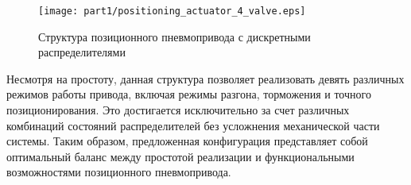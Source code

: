 \begin{figure}[ht]
    \centerfloat
    \texttt{[image: part1/positioning\_actuator\_4\_valve.eps]}
    \caption{Структура позиционного пневмопривода с дискретными распределителями}\label{fig:pp_base_struct}
    \end{figure}


Несмотря на простоту, данная структура позволяет реализовать девять различных режимов
работы привода, включая режимы разгона, торможения и точного позиционирования. Это достигается исключительно за счет
различных комбинаций состояний распределителей без усложнения механической части системы. Таким образом, предложенная
конфигурация представляет собой оптимальный баланс между простотой реализации и функциональными возможностями позиционного пневмопривода.
